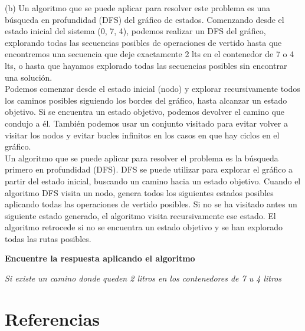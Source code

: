 \documentclass{article}
\begin{document}
(b) Un algoritmo que se puede aplicar para resolver este problema es una búsqueda en profundidad (DFS) del gráfico de estados. Comenzando desde el estado inicial del sistema (0, 7, 4), podemos realizar un DFS del gráfico, explorando todas las secuencias posibles de operaciones de vertido hasta que encontremos una secuencia que deje exactamente 2 lts en el contenedor de  7 o 4 lts, o hasta que hayamos explorado todas las secuencias posibles sin encontrar una solución.\\

Podemos comenzar desde el estado inicial (nodo) y explorar recursivamente todos los caminos posibles siguiendo los bordes del gráfico, hasta alcanzar un estado objetivo. Si se encuentra un estado objetivo, podemos devolver el camino que condujo a él. También podemos usar un conjunto visitado para evitar volver a visitar los nodos y evitar bucles infinitos en los casos en que hay ciclos en el gráfico.\\

Un algoritmo que se puede aplicar para resolver el problema es la búsqueda primero en profundidad (DFS). DFS se puede utilizar para explorar el gráfico a partir del estado inicial, buscando un camino hacia un estado objetivo. Cuando el algoritmo DFS visita un nodo, genera todos los siguientes estados posibles aplicando todas las operaciones de vertido posibles. Si no se ha visitado antes un siguiente estado generado, el algoritmo visita recursivamente ese estado. El algoritmo retrocede si no se encuentra un estado objetivo y se han explorado todas las rutas posibles.

\begin{question}
  \textbf{Encuentre la respuesta aplicando el algoritmo}\\
\end{question}
\textit{Si existe un camino donde queden 2 litros en los contenedores de 7 u 4 litros}

\section{Referencias}
\end{document}
